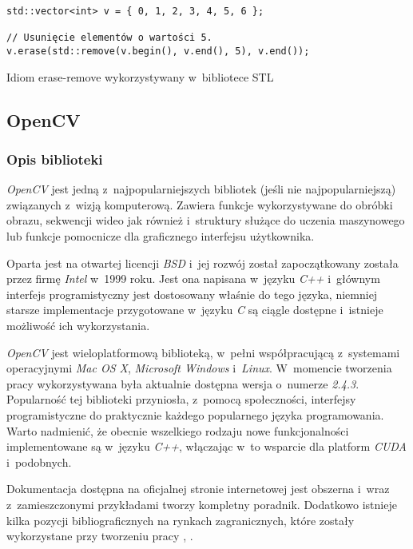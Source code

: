       \begin{sample}[ht]
        \begin{verbatim}
std::vector<int> v = { 0, 1, 2, 3, 4, 5, 6 };

// Usunięcie elementów o wartości 5.
v.erase(std::remove(v.begin(), v.end(), 5), v.end());
        \end{verbatim}
        \caption{Idiom erase-remove wykorzystywany w~bibliotece STL}
        \label{EraseRemoveIdiom}
      \end{sample}

    \subsection{OpenCV}\label{Subsection_OpenCV}

      \subsubsection{Opis biblioteki}
      \textit{OpenCV} jest jedną z~najpopularniejszych bibliotek (jeśli nie najpopularniejszą) związanych z~wizją komputerową. Zawiera funkcje wykorzystywane do obróbki obrazu, sekwencji wideo jak również i~struktury służące do uczenia maszynowego lub funkcje pomocnicze dla graficznego interfejsu użytkownika.

      Oparta jest na otwartej licencji \textit{BSD} i~jej rozwój został zapoczątkowany została przez firmę \textit{Intel} w~1999 roku. Jest ona napisana w~języku \textit{C++} i~głównym interfejs programistyczny jest dostosowany właśnie do tego języka, niemniej starsze implementacje przygotowane w~języku \textit{C} są ciągle dostępne i~istnieje możliwość ich wykorzystania.

      \textit{OpenCV} jest wieloplatformową biblioteką, w~pełni współpracującą z~systemami operacyjnymi \textit{Mac OS X}, \textit{Microsoft Windows} i~\textit{Linux}. W~momencie tworzenia pracy wykorzystywana była aktualnie dostępna wersja o~numerze \textit{2.4.3}. Popularność tej biblioteki przyniosła, z~pomocą społeczności, interfejsy programistyczne do praktycznie każdego popularnego języka programowania. Warto nadmienić, że obecnie wszelkiego rodzaju nowe funkcjonalności implementowane są w~języku \textit{C++}, włączając w~to wsparcie dla platform \textit{CUDA} i~podobnych.

      Dokumentacja dostępna na oficjalnej stronie internetowej jest obszerna i~wraz z~zamieszczonymi przykładami tworzy kompletny poradnik. Dodatkowo istnieje kilka pozycji bibliograficznych na rynkach zagranicznych, które zostały wykorzystane przy tworzeniu pracy \cite{LearningOpenCV}, \cite{OpenCVCookbook}.

